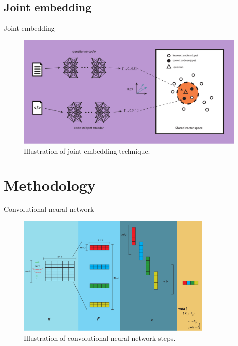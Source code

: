 \documentclass{beamer}
\begin{document}
    \subsection{Joint embedding}
    \begin{frame}{Joint embedding}
      \begin{figure}[h]
          \includegraphics[width=1\textwidth]{resources/joint_embedding-article.pdf}
          \caption{Illustration of joint embedding technique.}
          
          \label{fig:joint-embedding}
        \end{figure}
    \end{frame}

    \section{Methodology}
    
    \begin{frame}{Convolutional neural network}
      \begin{figure}[h]
          \includegraphics[width=0.85\textwidth]{resources/cnn-steps-word-embedding-article.pdf}
          \caption{Illustration of convolutional neural network steps.}
          
          \label{fig:convolutional-neural-network-steps}
        \end{figure}
    \end{frame}
    
\end{document}
